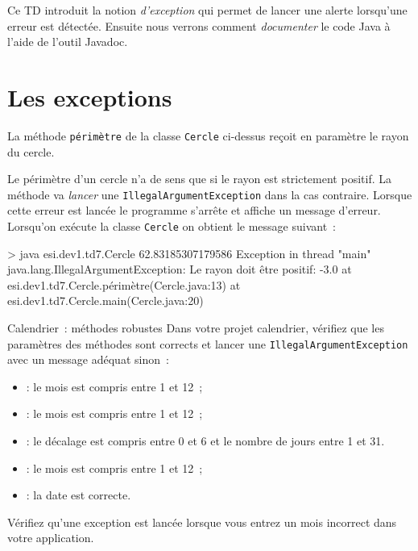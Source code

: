 \documentclass[a4paper,11pt]{article}
\date{2018 -- 2019}
\begin{document}
\entete
\titre
{}
\lastedit


	Ce TD introduit la notion \emph{d'exception} qui permet de lancer une alerte lorsqu'une erreur est détectée.
	Ensuite nous verrons comment \emph{documenter} le code Java à l'aide de l'outil Javadoc.
	
		 
	\tableofcontents

	\newpage

\section{Les exceptions}

	
	
	

	La méthode \texttt{périmètre} de la classe \texttt{Cercle} ci-dessus
	reçoit en paramètre le rayon du cercle.
	
	Le périmètre d'un cercle n'a de sens que si le rayon est strictement positif.  
	La méthode va \emph{lancer} une \texttt{IllegalArgumentException} dans la cas contraire. 
	Lorsque cette erreur est lancée le programme s'arrête et affiche un message d'erreur.
	Lorsqu'on exécute la classe \texttt{Cercle} on obtient le message suivant~:
	\begin{Console}
> java esi.dev1.td7.Cercle
62.83185307179586
Exception in thread "main" java.lang.IllegalArgumentException: Le rayon doit être positif: -3.0
	at esi.dev1.td7.Cercle.périmètre(Cercle.java:13)
	at esi.dev1.td7.Cercle.main(Cercle.java:20)
\end{Console}

	\begin{Exercice}{Calendrier~: méthodes robustes}
		Dans votre projet calendrier, vérifiez que les paramètres des méthodes sont corrects et lancer une 
		\texttt{IllegalArgumentException} avec un message adéquat sinon~:
		\begin{itemize}
			\item {}: le mois est compris entre 1 et 12~;
			\item {}: le mois est compris entre 1 et 12~;
			\item {}: le décalage est compris entre 0 et 6 et 
				le nombre de jours entre 1 et 31.
			\item  {}: le mois est compris entre 1 et 12~;
			\item {}: la date est correcte. 
		\end{itemize}
		
		Vérifiez qu'une exception est lancée lorsque vous entrez un mois incorrect dans votre application.
	\end{Exercice}
\end{document}
